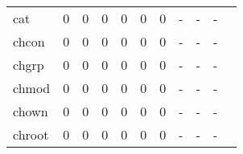 \begin{longtable}{lp{1.2cm}p{1.2cm}p{1.2cm}p{1.2cm}p{1.2cm}p{1.2cm}p{1.2cm}p{1.2cm}p{1.2cm}p{1.2cm}}
cat       &                                     0 &                                                  0 &                                                  0 &                                                  0 &                                                  0 &                                                  0 &                                             - &                                                  - &                                                  - \\
chcon     &                                     0 &                                                  0 &                                                  0 &                                                  0 &                                                  0 &                                                  0 &                                             - &                                                  - &                                                  - \\
chgrp     &                                     0 &                                                  0 &                                                  0 &                                                  0 &                                                  0 &                                                  0 &                                             - &                                                  - &                                                  - \\
chmod     &                                     0 &                                                  0 &                                                  0 &                                                  0 &                                                  0 &                                                  0 &                                             - &                                                  - &                                                  - \\
chown     &                                     0 &                                                  0 &                                                  0 &                                                  0 &                                                  0 &                                                  0 &                                             - &                                                  - &                                                  - \\
chroot    &                                     0 &                                                  0 &                                                  0 &                                                  0 &                                                  0 &                                                  0 &                                             - &                                                  - &                                                  - \\

\end{longtable}
